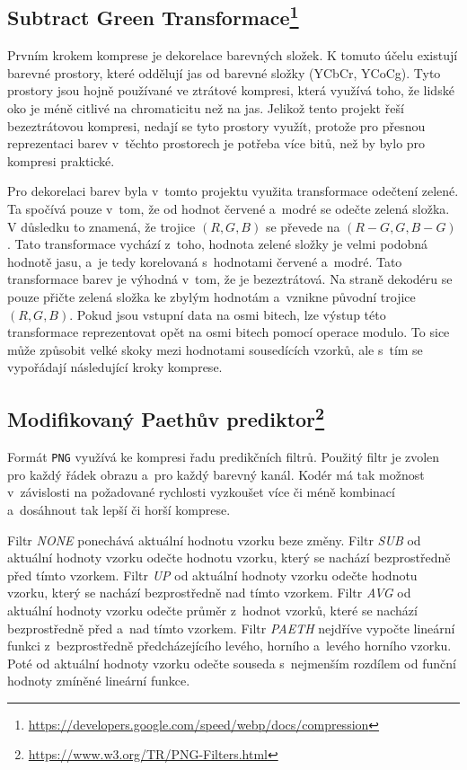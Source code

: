 \documentclass[a4paper, 11pt, titlepage]{article}
\begin{document}
	\subsection*{Subtract Green Transformace\footnote{\url{https://developers.google.com/speed/webp/docs/compression}}}
	Prvním krokem komprese je dekorelace barevných složek.
	K tomuto účelu existují barevné prostory, které oddělují jas od barevné složky (YCbCr, YCoCg).
	Tyto prostory jsou hojně používané ve ztrátové kompresi, která využívá toho, že lidské oko je méně citlivé na chromaticitu než na jas.
	Jelikož tento projekt řeší bezeztrátovou kompresi, nedají se tyto prostory využít, protože pro přesnou reprezentaci barev v~těchto prostorech je potřeba více bitů, než by bylo pro kompresi praktické.

	Pro dekorelaci barev byla v~tomto projektu využita transformace odečtení zelené.
	Ta spočívá pouze v~tom, že od hodnot červené a~modré se odečte zelená složka.
	V důsledku to znamená, že trojice $(R, G, B)$ se převede na $(R - G, G, B - G)$.
	Tato transformace vychází z~toho, hodnota zelené složky je velmi podobná hodnotě jasu, a~je tedy korelovaná s~hodnotami červené a~modré.
	Tato transformace barev je výhodná v~tom, že je bezeztrátová.
	Na straně dekodéru se pouze přičte zelená složka ke zbylým hodnotám a~vznikne původní trojice $(R,G,B)$.
	Pokud jsou vstupní data na osmi bitech, lze výstup této transformace reprezentovat opět na osmi bitech pomocí operace modulo.
	To sice může způsobit velké skoky mezi hodnotami sousedících vzorků, ale s~tím se vypořádají následující kroky komprese.

	\subsection*{Modifikovaný Paethův prediktor\footnote{\url{https://www.w3.org/TR/PNG-Filters.html}}}
	Formát \texttt{PNG} využívá ke kompresi řadu predikčních filtrů.
	Použitý filtr je zvolen pro každý řádek obrazu a~pro každý barevný kanál.
	Kodér má tak možnost v~závislosti na požadované rychlosti vyzkoušet více či méně kombinací a~dosáhnout tak lepší či horší komprese.

	Filtr \textit{NONE} ponechává aktuální hodnotu vzorku beze změny.
	Filtr \textit{SUB} od aktuální hodnoty vzorku odečte hodnotu vzorku, který se nachází bezprostředně před tímto vzorkem.
	Filtr \textit{UP} od aktuální hodnoty vzorku odečte hodnotu vzorku, který se nachází bezprostředně nad tímto vzorkem.
	Filtr \textit{AVG} od aktuální hodnoty vzorku odečte průměr z~hodnot vzorků, které se nachází bezprostředně před a~nad tímto vzorkem.
	Filtr \textit{PAETH} nejdříve vypočte lineární funkci z~bezprostředně před\-chá\-ze\-jí\-cí\-ho levého, horního a~levého horního vzorku.
	Poté od aktuální hodnoty vzorku odečte souseda s~nejmenším rozdílem od funční hodnoty zmíněné lineární funkce.
\end{document}

